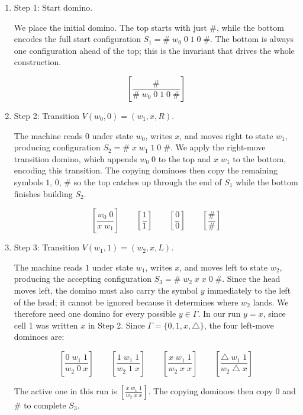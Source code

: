 \documentclass[12pt,a4paper,openany]{article}
\begin{document}
\begin{enumerate}

    \item Step 1: Start domino.

    We place the initial domino. The top starts with just $\#$, while the bottom encodes the
    full start configuration $S_1 = \#\;w_0\;0\;1\;0\;\#$. The bottom is always one
    configuration ahead of the top; this is the invariant that drives the whole construction.

    \[
    \left[\frac{\#}{\#\;w_0\;0\;1\;0\;\#}\right]
    \]

    \item Step 2: Transition $V(w_0, 0) = (w_1, x, R)$.

    The machine reads $0$ under state $w_0$, writes $x$, and moves right to state $w_1$,
    producing configuration $S_2 = \#\;x\;w_1\;1\;0\;\#$. We apply the right-move transition
    domino, which appends $w_0\;0$ to the top and $x\;w_1$ to the bottom, encoding this
    transition. The copying dominoes then copy the remaining symbols $1$, $0$, $\#$ so the top
    catches up through the end of $S_1$ while the bottom finishes building $S_2$.

    \[
    \left[\frac{w_0\;0}{x\;w_1}\right]
    \qquad
    \left[\frac{1}{1}\right]
    \qquad
    \left[\frac{0}{0}\right]
    \qquad
    \left[\frac{\#}{\#}\right]
    \]

    \item Step 3: Transition $V(w_1, 1) = (w_2, x, L)$.

    The machine reads $1$ under state $w_1$, writes $x$, and moves left to state $w_2$,
    producing the accepting configuration $S_3 = \#\;w_2\;x\;x\;0\;\#$. Since the head moves
    left, the domino must also carry the symbol $y$ immediately to the left of the head; it
    cannot be ignored because it determines where $w_2$ lands. We therefore need one domino
    for every possible $y \in \Gamma$. In our run $y = x$, since cell 1 was written $x$ in
    Step 2. Since $\Gamma = \{0, 1, x, \triangle\}$, the four left-move dominoes are:

    \[
    \left[\frac{0\;w_1\;1}{w_2\;0\;x}\right]
    \qquad
    \left[\frac{1\;w_1\;1}{w_2\;1\;x}\right]
    \qquad
    \left[\frac{x\;w_1\;1}{w_2\;x\;x}\right]
    \qquad
    \left[\frac{\triangle\;w_1\;1}{w_2\;\triangle\;x}\right]
    \]

    The active one in this run is $\left[\frac{x\;w_1\;1}{w_2\;x\;x}\right]$.
    The copying dominoes then copy $0$ and $\#$ to complete $S_3$.


\end{enumerate}
\end{document}

